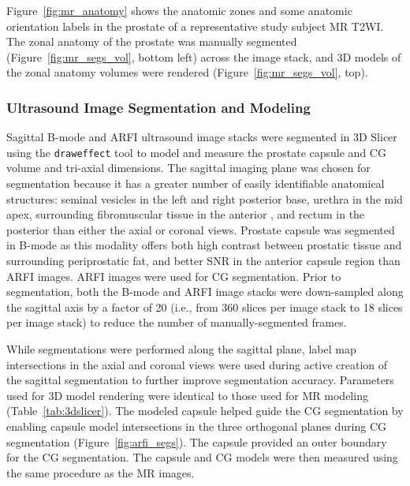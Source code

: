 

Figure~\ref{fig:mr_anatomy} shows the anatomic zones and some anatomic
orientation labels in the prostate of a representative study subject MR T2WI.
The zonal anatomy of the prostate was manually segmented
(Figure~\ref{fig:mr_segs_vol}, bottom left) across the image stack, and 3D
models of the zonal anatomy volumes were rendered
(Figure~\ref{fig:mr_segs_vol}, top).



\subsubsection{Ultrasound Image Segmentation and Modeling}
Sagittal B-mode and ARFI ultrasound image stacks were segmented in 3D Slicer
using the \verb+draweffect+ tool to model and measure the prostate capsule and
CG volume and tri-axial dimensions.  The sagittal imaging plane was chosen for
segmentation because it has a greater number of easily identifiable anatomical
structures:  seminal vesicles in the left and right posterior base, urethra in
the mid apex, surrounding fibromuscular tissue in the anterior , and rectum in
the posterior  than either the axial or coronal views. Prostate capsule was
segmented in B-mode as this modality offers both high contrast between
prostatic tissue and surrounding periprostatic fat, and better SNR in the
anterior capsule region than ARFI images. ARFI images were used for CG
segmentation.  Prior to segmentation, both the B-mode and ARFI image stacks
were down-sampled along the sagittal axis by a factor of 20 (i.e., from 360
slices per image stack to 18 slices per image stack) to reduce the number of
manually-segmented frames. 

While segmentations were performed along the sagittal plane, label map
intersections in the axial and coronal views were used during active creation
of the sagittal segmentation to further improve segmentation accuracy.
Parameters used for 3D model rendering were identical to those used for MR
modeling (Table~\ref{tab:3dslicer}).  The modeled capsule helped guide the CG
segmentation by enabling capsule model intersections in the three orthogonal
planes during CG segmentation (Figure~\ref{fig:arfi_segs}). The capsule provided
an outer boundary for the CG segmentation. The capsule and CG models were then
measured using the same procedure as the MR images.



